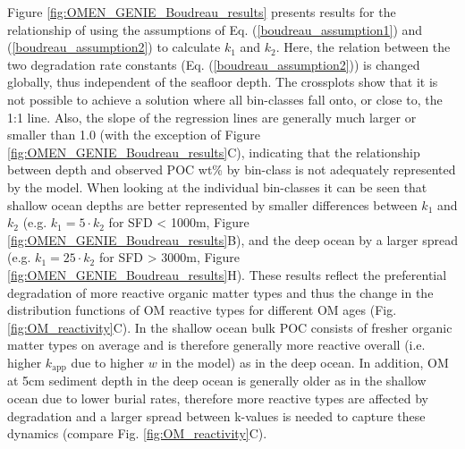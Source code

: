 \documentclass[gmd, manuscript]{copernicus}
\begin{document}
Figure \ref{fig:OMEN_GENIE_Boudreau_results} presents results for the relationship of \citet{boudreau1997diagenetic} using the assumptions of Eq. (\ref{boudreau_assumption1}) and (\ref{boudreau_assumption2}) to calculate $k_1$ 
and $k_2$. Here, the relation between the two degradation rate constants (Eq. (\ref{boudreau_assumption2})) is changed globally, thus independent of the seafloor depth. 
The crossplots show that it is not possible to achieve a solution where all bin-classes fall onto, or close to, the 1:1 line. Also, the slope of the regression lines are generally much larger or smaller than 1.0 
(with the exception of Figure \ref{fig:OMEN_GENIE_Boudreau_results}C), indicating that the relationship between depth and observed POC wt\% by bin-class is not adequately represented by the model. 
When looking at the individual bin-classes it can be seen that shallow ocean depths are better represented by smaller differences between $k_1$ and $k_2$ (e.g. $k_1 = 5 \cdot k_2$ for SFD < 1000m, Figure \ref{fig:OMEN_GENIE_Boudreau_results}B),
and the deep ocean by a larger spread (e.g. $k_1 = 25 \cdot k_2$ for SFD > 3000m, Figure \ref{fig:OMEN_GENIE_Boudreau_results}H). 
These results reflect the preferential degradation of more reactive organic matter types \citep{wakeham_compositions_1997, lee_composition_2000} and thus the change in the distribution functions of OM reactive types for different OM ages (Fig. \ref{fig:OM_reactivity}C). 
In the shallow ocean bulk POC consists of fresher organic matter types on average and is therefore generally more reactive overall (i.e. higher $k_\mathrm{app}$ due to higher $w$ in the model) as in the deep ocean. In addition, OM at 5cm sediment depth in 
the deep ocean is generally older as in the shallow ocean due to lower burial rates, therefore more reactive types are affected by degradation and a larger spread between k-values is needed to capture these dynamics (compare Fig. \ref{fig:OM_reactivity}C). 
\end{document}

